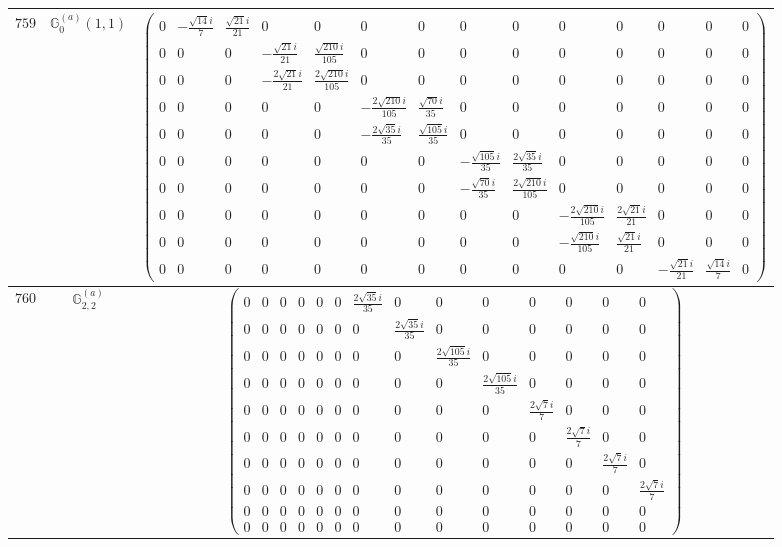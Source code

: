 \documentclass[fleqn,8pt,landscape]{jsarticle}
\begin{document}
\begin{center}
\begin{longtable}{ccc}
$ 759 $ & $ \mathbb{G}_{0}^{(a)}(1,1) $ & $ \begin{pmatrix} 0 & - \frac{\sqrt{14} i}{7} & \frac{\sqrt{21} i}{21} & 0 & 0 & 0 & 0 & 0 & 0 & 0 & 0 & 0 & 0 & 0 \\ 0 & 0 & 0 & - \frac{\sqrt{21} i}{21} & \frac{\sqrt{210} i}{105} & 0 & 0 & 0 & 0 & 0 & 0 & 0 & 0 & 0 \\ 0 & 0 & 0 & - \frac{2 \sqrt{21} i}{21} & \frac{2 \sqrt{210} i}{105} & 0 & 0 & 0 & 0 & 0 & 0 & 0 & 0 & 0 \\ 0 & 0 & 0 & 0 & 0 & - \frac{2 \sqrt{210} i}{105} & \frac{\sqrt{70} i}{35} & 0 & 0 & 0 & 0 & 0 & 0 & 0 \\ 0 & 0 & 0 & 0 & 0 & - \frac{2 \sqrt{35} i}{35} & \frac{\sqrt{105} i}{35} & 0 & 0 & 0 & 0 & 0 & 0 & 0 \\ 0 & 0 & 0 & 0 & 0 & 0 & 0 & - \frac{\sqrt{105} i}{35} & \frac{2 \sqrt{35} i}{35} & 0 & 0 & 0 & 0 & 0 \\ 0 & 0 & 0 & 0 & 0 & 0 & 0 & - \frac{\sqrt{70} i}{35} & \frac{2 \sqrt{210} i}{105} & 0 & 0 & 0 & 0 & 0 \\ 0 & 0 & 0 & 0 & 0 & 0 & 0 & 0 & 0 & - \frac{2 \sqrt{210} i}{105} & \frac{2 \sqrt{21} i}{21} & 0 & 0 & 0 \\ 0 & 0 & 0 & 0 & 0 & 0 & 0 & 0 & 0 & - \frac{\sqrt{210} i}{105} & \frac{\sqrt{21} i}{21} & 0 & 0 & 0 \\ 0 & 0 & 0 & 0 & 0 & 0 & 0 & 0 & 0 & 0 & 0 & - \frac{\sqrt{21} i}{21} & \frac{\sqrt{14} i}{7} & 0 \end{pmatrix} $ \\ \hline
$ 760 $ & $ \mathbb{G}_{2,2}^{(a)} $ & $ \begin{pmatrix} 0 & 0 & 0 & 0 & 0 & 0 & \frac{2 \sqrt{35} i}{35} & 0 & 0 & 0 & 0 & 0 & 0 & 0 \\ 0 & 0 & 0 & 0 & 0 & 0 & 0 & \frac{2 \sqrt{35} i}{35} & 0 & 0 & 0 & 0 & 0 & 0 \\ 0 & 0 & 0 & 0 & 0 & 0 & 0 & 0 & \frac{2 \sqrt{105} i}{35} & 0 & 0 & 0 & 0 & 0 \\ 0 & 0 & 0 & 0 & 0 & 0 & 0 & 0 & 0 & \frac{2 \sqrt{105} i}{35} & 0 & 0 & 0 & 0 \\ 0 & 0 & 0 & 0 & 0 & 0 & 0 & 0 & 0 & 0 & \frac{2 \sqrt{7} i}{7} & 0 & 0 & 0 \\ 0 & 0 & 0 & 0 & 0 & 0 & 0 & 0 & 0 & 0 & 0 & \frac{2 \sqrt{7} i}{7} & 0 & 0 \\ 0 & 0 & 0 & 0 & 0 & 0 & 0 & 0 & 0 & 0 & 0 & 0 & \frac{2 \sqrt{7} i}{7} & 0 \\ 0 & 0 & 0 & 0 & 0 & 0 & 0 & 0 & 0 & 0 & 0 & 0 & 0 & \frac{2 \sqrt{7} i}{7} \\ 0 & 0 & 0 & 0 & 0 & 0 & 0 & 0 & 0 & 0 & 0 & 0 & 0 & 0 \\ 0 & 0 & 0 & 0 & 0 & 0 & 0 & 0 & 0 & 0 & 0 & 0 & 0 & 0 \end{pmatrix} $ \\ \hline

\end{longtable}
\end{center}
\end{document}
